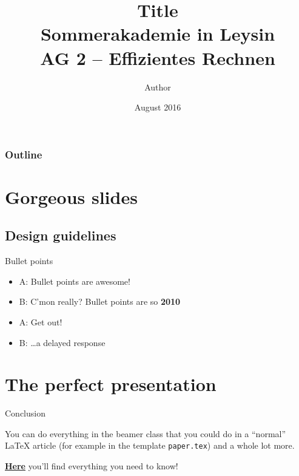 \documentclass{beamer}
\title[Short Title]{%
	\Large Title\\
	[5mm] \normalsize Sommerakademie in Leysin\\
	AG 2 -- Effizientes Rechnen
}
\author[Short author]{Author}
\institute[]{%
	University of Awesomeness\\[3mm]
}
\date{August 2016}
\begin{document}
\begin{frame}
	\titlepage
\end{frame}

\begin{frame}
	\frametitle{Outline}
	\tableofcontents
\end{frame}

\section{Gorgeous slides}

\AtBeginSection[]{%
  \begin{frame}
  \tableofcontents[currentsection]
  \end{frame}
}

\subsection{Design guidelines}

\begin{frame}{Bullet points}
  \begin{itemize}
    \item A: Bullet points are awesome!
    \item B: C'mon really? Bullet points are so
      \textbf<2->{\textcolor<2->{greeniot1}{2010}}
    \item A: \alert{Get out!}
    \item<2-> B: \dots a delayed response
  \end{itemize}
  \begin{center}
  \end{center}
\end{frame}

\section{The perfect presentation}
\begin{frame}{Conclusion}
  \begin{center}
    You can do everything in the beamer class that you could do in a ``normal''
    \LaTeX{} article (for example in the template \texttt{paper.tex}) and a
    whole lot more.

    \href{https://www.ctan.org/pkg/beamer}{\textbf{Here}} you'll find everything
    you need to know!
  \end{center}
\end{frame}
\end{document}
